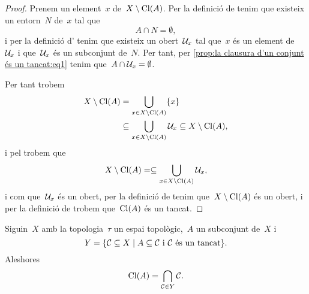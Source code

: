 \documentclass[../../main.tex]{subfiles}
\begin{document}
    \begin{proof}
         Prenem un element~\(x\) de~\(X\setminus\operatorname{Cl}(A)\).
         Per la definició de  tenim que existeix un entorn~\(N\) de~\(x\) tal que
         \begin{equation}
             \label{prop:la clausura d'un conjunt és un tancat:eq1}
             A\cap N=\emptyset,
         \end{equation}
         i per la definició d' tenim que existeix un obert~\(\mathcal{U}_{x}\) tal que~\(x\) és un element de~\(\mathcal{U}_{x}\) i que~\(\mathcal{U}_{x}\) és un subconjunt de~\(N\).
         Per tant, per \eqref{prop:la clausura d'un conjunt és un tancat:eq1} tenim que~\(A\cap\mathcal{U}_{x}=\emptyset\).

         Per tant trobem
         \begin{align*}
             X\setminus\operatorname{Cl}(A)&=\bigcup_{x\in X\setminus\operatorname{Cl}(A)}\{x\} \\
             &\subseteq\bigcup_{x\in X\setminus\operatorname{Cl}(A)}\mathcal{U}_{x}\subseteq X\setminus\operatorname{Cl}(A),
         \end{align*}
         i pel  trobem que
         \[
             X\setminus\operatorname{Cl}(A)=\subseteq\bigcup_{x\in X\setminus\operatorname{Cl}(A)}\mathcal{U}_{x},
         \]
         i com que~\(\mathcal{U}_{x}\) és un obert, per la definició de  tenim que~\(X\setminus\operatorname{Cl}(A)\) és un obert, i per la definició de  trobem que~\(\operatorname{Cl}(A)\) és un tancat.
    \end{proof}
    \begin{proposition}
        \label{prop:la clausura d'un conjunt és l'intersecció de tots els tancats que contenen el conjunt}
        Siguin~\(X\) amb la topologia~\(\tau\) un espai topològic,~\(A\) un subconjunt de~\(X\) i
        \[
            Y=\{\mathcal{C}\subseteq X\mid A\subseteq\mathcal{C}\text{ i }\mathcal{C}\text{ és un tancat}\}.
        \]
        Aleshores
        \[
            \operatorname{Cl}(A)=\bigcap_{\mathcal{C}\in Y}\mathcal{C}.
        \]
    \end{proposition}
\end{document}
